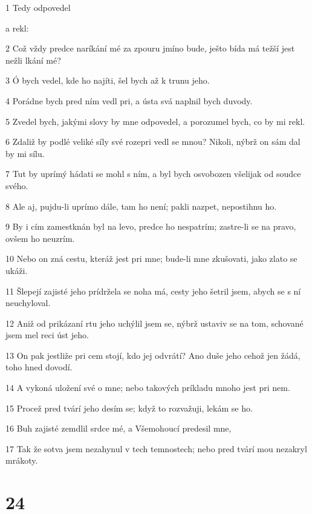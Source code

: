 \par 1 Tedy odpovedel \par a rekl:
\par 2 Což vždy predce naríkání mé za zpouru jmíno bude, ješto bída má težší jest nežli lkání mé?
\par 3 Ó bych vedel, kde ho najíti, šel bych až k trunu jeho.
\par 4 Porádne bych pred ním vedl pri, a ústa svá naplnil bych duvody.
\par 5 Zvedel bych, jakými slovy by mne odpovedel, a porozumel bych, co by mi rekl.
\par 6 Zdaliž by podlé veliké síly své rozepri vedl se mnou? Nikoli, nýbrž on sám dal by mi sílu.
\par 7 Tut by uprímý hádati se mohl s ním, a byl bych osvobozen všelijak od soudce svého.
\par 8 Ale aj, pujdu-li uprímo dále, tam ho není; pakli nazpet, nepostihnu ho.
\par 9 By i cím zamestknán byl na levo, predce ho nespatrím; zastre-li se na pravo, ovšem ho neuzrím.
\par 10 Nebo on zná cestu, kteráž jest pri mne; bude-li mne zkušovati, jako zlato se ukáži.
\par 11 Šlepejí zajisté jeho prídržela se noha má, cesty jeho šetril jsem, abych se s ní neuchyloval.
\par 12 Aniž od prikázaní rtu jeho uchýlil jsem se, nýbrž ustaviv se na tom, schované jsem mel reci úst jeho.
\par 13 On pak jestliže pri cem stojí, kdo jej odvrátí? Ano duše jeho cehož jen žádá, toho hned dovodí.
\par 14 A vykoná uložení své o mne; nebo takových príkladu mnoho jest pri nem.
\par 15 Procež pred tvárí jeho desím se; když to rozvažuji, lekám se ho.
\par 16 Buh zajisté zemdlil srdce mé, a Všemohoucí predesil mne,
\par 17 Tak že sotva jsem nezahynul v tech temnostech; nebo pred tvárí mou nezakryl mrákoty.

\chapter{24}

